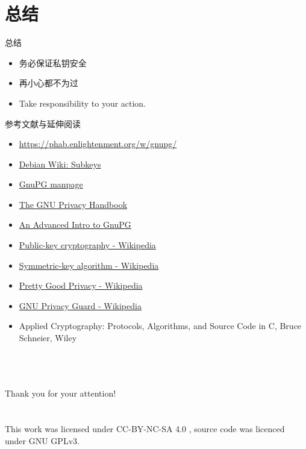 \documentclass{beamer}
\begin{document}
	\section{总结}
		\begin{frame}{总结}
		\begin{itemize}
			\item 务必保证私钥安全
			\item 再小心都不为过
			\item Take responsibility to your action.
		\end{itemize}
	\end{frame}
	
	\begin{frame}{参考文献与延伸阅读}
		\begin{itemize}
			\item \href{https://phab.enlightenment.org/w/gnupg/}{https://phab.enlightenment.org/w/gnupg/}
			\item \href{https://wiki.debian.org/Subkeys}{Debian Wiki: Subkeys}
			\item \href{https://www.gnupg.org/gph/de/manual/r1023.html}{GnuPG manpage}
			\item \href{https://www.gnupg.org/gph/en/manual/book1.html}{The GNU Privacy Handbook}
			\item \href{https://begriffs.com/posts/2016-11-05-advanced-intro-gnupg.html}{An Advanced Intro to GnuPG}
			\item \href{https://en.wikipedia.org/wiki/Public-key_cryptography}{Public-key cryptography - Wikipedia}
			\item \href{https://en.wikipedia.org/wiki/Symmetric-key_algorithm}{Symmetric-key algorithm - Wikipedia}
			\item \href{https://en.wikipedia.org/wiki/Pretty_Good_Privacy}{Pretty Good Privacy - Wikipedia}
			\item \href{https://en.wikipedia.org/wiki/GNU_Privacy_Guard}{GNU Privacy Guard - Wikipedia}
			\item Applied Cryptography: Protocols, Algorithms, and Source Code in C, Bruce Schneier, Wiley
		\end{itemize}
	\end{frame}

\begin{frame}
~ \\ ~ \\ ~ \\
\Large{Thank you for your attention!} \\ ~ \\ ~ \\
\small{This work was licensed under CC-BY-NC-SA 4.0 , source code was licenced under GNU GPLv3.}
\end{frame}
\end{document}
